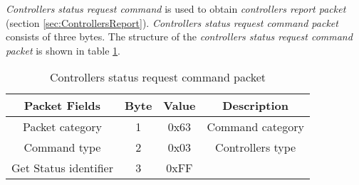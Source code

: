 \textit{Controllers status request command} is used to obtain \textit{controllers report packet} (section \ref{sec:ControllersReport}). \textit{Controllers status request command packet} consists of three bytes. The structure of the \textit{controllers status request command packet} is shown in table \ref{tab:controllersStatusReuqestCommandPacket}.
\begin{table}[h]
\begin{center}
\begin{tabular}{c c c c}
\toprule
\rowcolor[HTML]{FFFC9E} 
\textbf{Packet Fields} & \textbf{Byte} & \textbf{Value} & \textbf{Description}   \\ \midrule
Packet category        & 1             & 0x63                & Command category       \\ [1ex]
Command type           & 2             & 0x03                & Controllers type       \\ [1ex]
Get Status identifier  & 3             & 0xFF                &                        \\ [1ex] \bottomrule
\end{tabular}
\end{center}
\caption{Controllers status request command packet}
\label{tab:controllersStatusReuqestCommandPacket}
\end{table}


